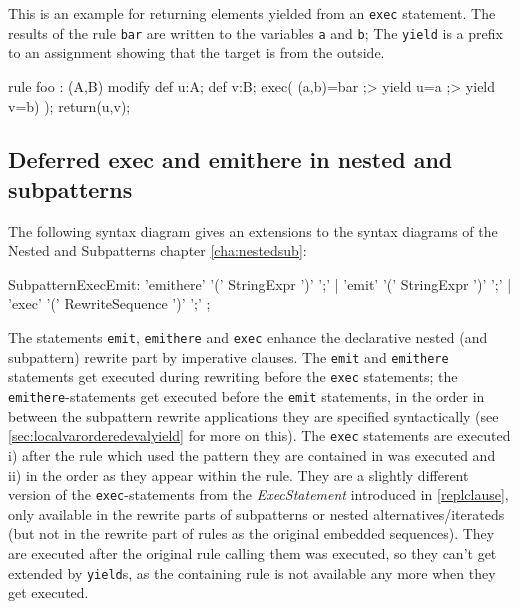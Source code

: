 \begin{example}
This is an example for returning elements yielded from an \texttt{exec} statement.
The results of the rule \texttt{bar} are written to the variables \texttt{a} and \texttt{b};
The \texttt{yield} is a prefix to an assignment showing that the target is from the outside. 

	\begin{grgen}
rule foo : (A,B)
{
  modify {
    def u:A; def v:B;
    exec( (a,b)=bar ;> yield u=a ;> yield v=b) );
    return(u,v);
  }
}  
	\end{grgen}
\end{example}

\subsection{Deferred exec and emithere in nested and subpatterns}\label{sec:deferredexecemithere}

The following syntax diagram gives an extensions to the syntax diagrams of the Nested and Subpatterns chapter \ref{cha:nestedsub}:
\begin{rail}  
  SubpatternExecEmit: 
		'emithere' '(' StringExpr ')' ';' |
		'emit' '(' StringExpr ')' ';' |
		'exec' '(' RewriteSequence ')' ';'
	;
\end{rail}

The statements \texttt{emit}, \texttt{emithere} and \texttt{exec} enhance the declarative nested (and subpattern) rewrite part by imperative clauses.
The \texttt{emit} and \texttt{emithere} statements get executed during rewriting before the \texttt{exec} statements;
the \texttt{emithere}-statements get executed before the \texttt{emit} statements,
in the order in between the subpattern rewrite applications they are specified syntactically
(see \ref{sec:localvarorderedevalyield} for more on this).
The \texttt{exec} statements are executed i) after the rule which used the pattern they are contained in was executed and ii) in the order as they appear within the rule.
They are a slightly different version of the \texttt{exec}-statements from the \emph{ExecStatement} introduced in \ref{replclause}, only available in the rewrite parts of subpatterns or nested alternatives/iterateds
(but not in the rewrite part of rules as the original embedded sequences).
They are executed after the original rule calling them was executed,
so they can't get extended by \texttt{yield}s, 
as the containing rule is not available any more when they get executed.

